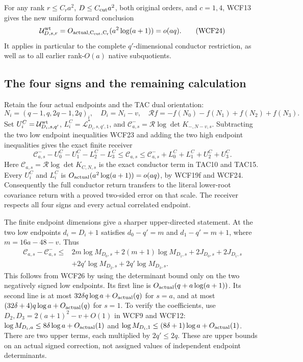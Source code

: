 \documentclass[11pt,a4paper]{article}
\begin{document}
For any rank $r\le C_r a^2$, $D\le C_{\rm cut}a^2$, both original orders,
and $c=1,4$, WCF13 gives the new uniform forward conclusion
\[
 \mathcal U^{\rm wt}_{D,s,r}=O_{\rm actual,C_{\rm cut},C_r}(a^2\log(a+1))
                            =o(aq).
 \tag{WCF24}
\]
It applies in particular to the complete $q'$-dimensional conductor
restriction, as well as to all earlier rank-$O(a)$ native subquotients.

\subsection{The four signs and the remaining calculation}

Retain the four actual endpoints and the TAC dual orientation:
\[
 N_i=(q-1,q,2q-1,2q)_i,\quad D_i=N_i-v,\quad
 \mathcal R f=-f(N_0)-f(N_1)+f(N_2)+f(N_3).
 \tag{WCF25}
\]
Set $U_i^C=\mathcal U^{\rm wt}_{D_i,s,q'}$,
$L_i^C=\mathcal L_{D_i,s,q',1}^*$, and
$\mathcal C^-_{a,s}=\mathcal R\log\det K_{-,N-v,s}$.
Subtracting the two low endpoint inequalities WCF23 and adding the
two high endpoint inequalities gives the exact finite receiver
\[
 \boxed{\quad
 \mathcal C^-_{a,s}-U_0^C-U_1^C-L_2^C-L_3^C
 \le\mathcal C_{a,s}
 \le\mathcal C^-_{a,s}+L_0^C+L_1^C+U_2^C+U_3^C.
 \quad}\tag{WCF26}
\]
Here $\mathcal C_{a,s}=\mathcal R\log\det K_{C,N,s}$ is the exact
conductor term in TAC10 and TAC15. Every $U_i^C$ and $L_i^C$ is
$O_{\rm actual}(a^2\log(a+1))=o(aq)$, by WCF19f and WCF24.
Consequently the full conductor return transfers to the literal
lower-root covariance return with a proved two-sided error on that
scale. The receiver respects all four signs and every actual correlated
endpoint.

The finite endpoint dimensions give a sharper upper-directed statement.
At the two low endpoints $d_i=D_i+1$ satisfies
$d_0-q'=m$ and $d_1-q'=m+1$, where $m=16a-48-v$. Thus
\[
 \begin{split}
 \mathcal C_{a,s}-\mathcal C^-_{a,s}
 \le{}&2m\log M_{D_0,s}+2(m+1)\log M_{D_1,s}
            +2J_{D_0,s}+2J_{D_1,s}\\
       &+2q'\log M_{D_2,s}+2q'\log M_{D_3,s}.
 \end{split}\tag{WCF26a}
\]
This follows from WCF26 by using the determinant bound only on the
two negatively signed low endpoints. Its first line is
$O_{\rm actual}(q+a\log(a+1))$. Its second line is at most
$32\delta q\log a+O_{\rm actual}(q)$ for $s=a$, and at most
$(32\delta+4)q\log a+O_{\rm actual}(q)$ for $s=1$. To verify the
coefficients, use $D_2,D_3=2(a+1)^2-v+O(1)$ in WCF9 and WCF12:
$\log M_{D_i,a}\le8\delta\log a+O_{\rm actual}(1)$ and
$\log M_{D_i,1}\le(8\delta+1)\log a+O_{\rm actual}(1)$.
There are two upper terms, each multiplied by $2q'\le2q$.
These are upper bounds on an actual signed correction, not assigned
values of independent endpoint determinants.
\end{document}
